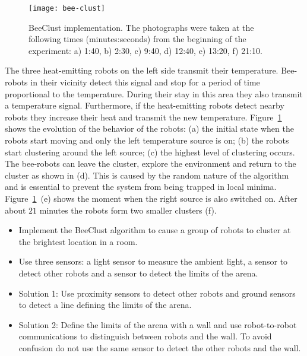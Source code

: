 \begin{figure}
\begin{center}
\texttt{[image: bee-clust]}
\end{center}
\caption{BeeClust implementation. The photographs were taken at the following times (minutes:seconds) from the beginning of the experiment: a) 1:40, b) 2:30, c) 9:40, d) 12:40, e) 13:20, f) 21:10.}\label{fig.beeclust-demo}
\end{figure}

The three heat-emitting robots on the left side transmit their temperature. Bee-robots in their vicinity detect this signal and stop for a period of time proportional to the temperature. During their stay in this area they also transmit a temperature signal. Furthermore, if the heat-emitting robots detect nearby robots they increase their heat and transmit the new temperature. Figure~\ref{fig.beeclust-demo} shows the evolution of the behavior of the robots: (a) the initial state when the robots start moving and only the left temperature source is on; (b) the robots start clustering around the left source; (c) the highest level of clustering occurs. The bee-robots can leave the cluster, explore the environment and return to the cluster as shown in (d). This is caused by the random nature of the algorithm and is essential to prevent the system from being trapped in local minima. Figure~\ref{fig.beeclust-demo}~(e) shows the moment when the right source is also switched on. After about $21$ minutes the robots form two smaller clusters (f).

\begin{framed}
\begin{itemize}
\item Implement the BeeClust algorithm to cause a group of robots to cluster at the brightest location in a room.
\item Use three sensors: a light sensor to measure the ambient light, a sensor to detect other robots and a sensor to detect the limits of the arena.
\item Solution 1: Use proximity sensors to detect other robots and ground sensors to detect a line defining the limits of the arena.
\item Solution 2: Define the limits of the arena with a wall and use robot-to-robot communications to distinguish between robots and the wall. To avoid confusion do not use the same sensor to detect the other robots and the wall.
\end{itemize}
\end{framed}

